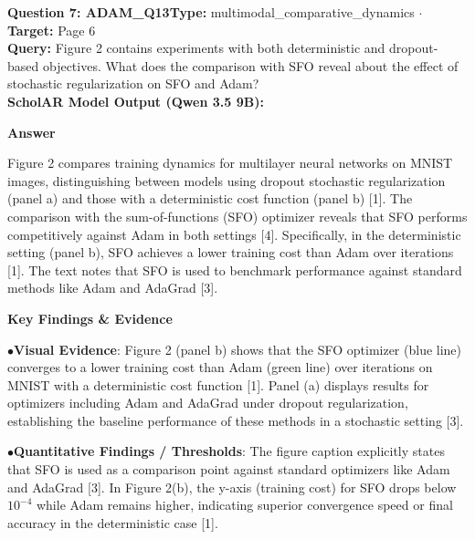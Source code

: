 \documentclass[10pt,a4paper]{article}
\begin{document}
\vspace{4pt}
\begin{tcolorbox}[questionbox]
{\noindent\bfseries\large\color{navy} Question 7: ADAM\_Q13}\hfill {\footnotesize\color{darkteal}\textbf{Type:} multimodal\_comparative\_dynamics $\cdot$ \textbf{Target:} Page 6}\\[4pt]
{\noindent\bfseries\color{accentblue} Query: } Figure 2 contains experiments with both deterministic and dropout-based objectives. What does the comparison with SFO reveal about the effect of stochastic regularization on SFO and Adam?\\[6pt]
{\noindent\bfseries\color{navy} ScholAR Model Output (Qwen 3.5 9B):}\\[2pt]
{\small \noindent \textbf{Answer}\par\vspace{3pt}Figure 2 compares training dynamics for multilayer neural networks on MNIST images, distinguishing between models using dropout stochastic regularization (panel a) and those with a deterministic cost function (panel b) [1]. The comparison with the sum-of-functions (SFO) optimizer reveals that SFO performs competitively against Adam in both settings [4]. Specifically, in the deterministic setting (panel b), SFO achieves a lower training cost than Adam over iterations [1].  The text notes that SFO is used to benchmark performance against standard methods like Adam and AdaGrad [3].\par\vspace{3pt}\noindent \textbf{Key Findings \& Evidence}\par\vspace{3pt}\noindent\hspace*{8pt}$\bullet$\hspace*{4pt}\textbf{Visual Evidence}: Figure 2 (panel b) shows that the SFO optimizer (blue line) converges to a lower training cost than Adam (green line) over iterations on MNIST with a deterministic cost function [1]. Panel (a) displays results for optimizers including Adam and AdaGrad under dropout regularization, establishing the baseline performance of these methods in a stochastic setting [3].\par\vspace{3pt}\noindent\hspace*{8pt}$\bullet$\hspace*{4pt}\textbf{Quantitative Findings / Thresholds}: The figure caption explicitly states that SFO is used as a comparison point against standard optimizers like Adam and AdaGrad [3]. In Figure 2(b), the y-axis (training cost) for SFO drops below $10^{-4}$ while Adam remains higher, indicating superior convergence speed or final accuracy in the deterministic case [1].}\\[6pt]

\end{tcolorbox}
\end{document}
